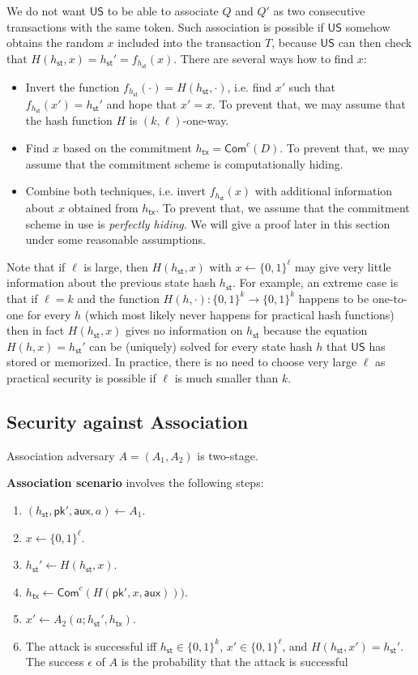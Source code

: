 \documentclass{article}
\newcommand{\pubkey}[0]{\mathsf{pk}}
\newcommand{\commitc}[0]{\mathsf{Com}^{c}}
\newcommand{\unisrv}[0]{\mathsf{US}}
\newcommand{\sthash}[0]{h_\mathsf{st}}
\newcommand{\txhash}[0]{h_\mathsf{tx}}
\newcommand{\auxd}[0]{\mathsf{aux}}
\begin{document}
We do not want $\unisrv$ to be able to associate $Q$ and $Q'$ as two consecutive transactions with the same token. Such association is possible if $\unisrv$ somehow obtains the random $x$ included into the transaction $T$, because $\unisrv$ can then check that $H(\sthash,x)=\sthash'=f_{\sthash}(x)$. There are several ways how to find $x$:
\begin{itemize}
\item Invert the function $f_{\sthash}(\cdot)=H(\sthash,\cdot)$, i.e. find $x'$ such that $f_{\sthash}(x')=\sthash'$ and hope that $x'=x$. To prevent that, we may assume that the hash function $H$ is $(k,\ell)$-one-way.
\item Find $x$ based on the commitment $\txhash=\commitc(D)$. To prevent that, we may assume that the commitment scheme is computationally hiding.
\item Combine both techniques, i.e. invert $f_{\sthash}(x)$ with additional information about $x$ obtained from $\txhash$. To prevent that, we assume that the commitment scheme in use is \emph{perfectly hiding}. We will give a proof later in this section under some reasonable assumptions.
\end{itemize}

\noindent Note that if $\ell$ is large, then $H(\sthash,x)$ with $x\gets \{0,1\}^\ell$ may give very little information about the previous state hash $\sthash$.
For example, an extreme case is that if $\ell=k$ and the function $H(h,\cdot)\colon \{0,1\}^k\rightarrow \{0,1\}^k$ happens to be one-to-one for every $h$ (which most likely never happens for practical hash functions) then in fact $H(\sthash,x)$ gives no information on $\sthash$  because the equation $H(h,x)=\sthash'$ can be (uniquely) solved for every state hash $h$ that $\unisrv$ has stored or memorized. In practice, there is no need to choose very large $\ell$ as practical security is possible if $\ell$ is much smaller than $k$.

\subsection{Security against Association}

Association adversary $A=(A_1,A_2)$ is two-stage. \medskip

\noindent\textbf{Association scenario} involves the following steps:
\begin{enumerate}
\item $(\sthash, \pubkey', \auxd, a)\gets A_1$.
\item $x\gets \{0,1\}^\ell$.
\item $\sthash'\gets H(\sthash,x)$.
\item $\txhash\gets\commitc(H(\pubkey',x,\auxd)))$.
\item $x'\gets A_2(a; \sthash',\txhash)$.
\item The attack is successful iff $\sthash\in\{0,1\}^k$, $x'\in\{0,1\}^\ell$, and $H(\sthash,x')=\sthash'$. The success $\epsilon$ of $A$ is the probability that the attack is successful
\end{enumerate}
\end{document}
